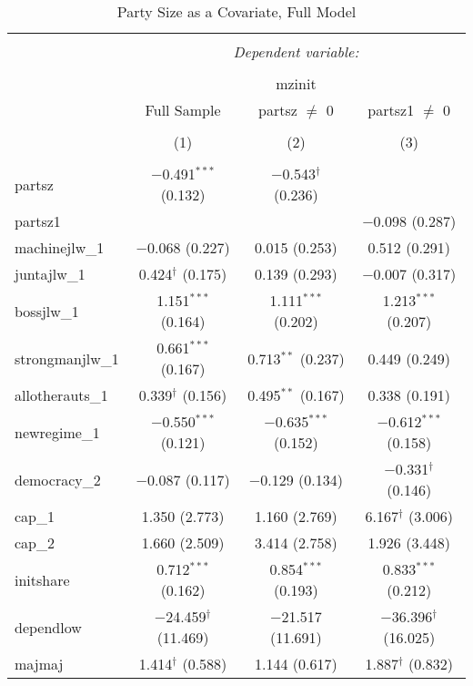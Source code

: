
\begin{table}[!htbp] \centering 
  \caption{Party Size as a Covariate, Full Model} 
  \label{} 
\begin{tabular}{@{\extracolsep{5pt}}lccc} 
\\[-1.8ex]\hline 
\hline \\[-1.8ex] 
 & \multicolumn{3}{c}{\textit{Dependent variable:}} \\ 
\cline{2-4} 
\\[-1.8ex] & \multicolumn{3}{c}{mzinit} \\ 
 & Full Sample & partsz $\neq$ 0 & partsz1 $\neq$ 0 \\ 
\\[-1.8ex] & (1) & (2) & (3)\\ 
\hline \\[-1.8ex] 
 partsz & $-$0.491$^{***}$ (0.132) & $-$0.543$^{\dagger}$ (0.236) &  \\ 
  partsz1 &  &  & $-$0.098 (0.287) \\ 
  machinejlw\_1 & $-$0.068 (0.227) & 0.015 (0.253) & 0.512 (0.291) \\ 
  juntajlw\_1 & 0.424$^{\dagger}$ (0.175) & 0.139 (0.293) & $-$0.007 (0.317) \\ 
  bossjlw\_1 & 1.151$^{***}$ (0.164) & 1.111$^{***}$ (0.202) & 1.213$^{***}$ (0.207) \\ 
  strongmanjlw\_1 & 0.661$^{***}$ (0.167) & 0.713$^{**}$ (0.237) & 0.449 (0.249) \\ 
  allotherauts\_1 & 0.339$^{\dagger}$ (0.156) & 0.495$^{**}$ (0.167) & 0.338 (0.191) \\ 
  newregime\_1 & $-$0.550$^{***}$ (0.121) & $-$0.635$^{***}$ (0.152) & $-$0.612$^{***}$ (0.158) \\ 
  democracy\_2 & $-$0.087 (0.117) & $-$0.129 (0.134) & $-$0.331$^{\dagger}$ (0.146) \\ 
  cap\_1 & 1.350 (2.773) & 1.160 (2.769) & 6.167$^{\dagger}$ (3.006) \\ 
  cap\_2 & 1.660 (2.509) & 3.414 (2.758) & 1.926 (3.448) \\ 
  initshare & 0.712$^{***}$ (0.162) & 0.854$^{***}$ (0.193) & 0.833$^{***}$ (0.212) \\ 
  dependlow & $-$24.459$^{\dagger}$ (11.469) & $-$21.517 (11.691) & $-$36.396$^{\dagger}$ (16.025) \\ 
  majmaj & 1.414$^{\dagger}$ (0.588) & 1.144 (0.617) & 1.887$^{\dagger}$ (0.832) \\ 

\end{tabular}
\end{table}
